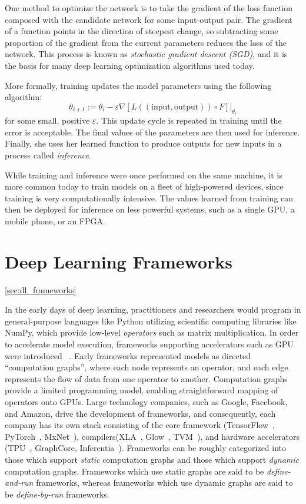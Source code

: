 One method to optimize the network is to take the gradient of the loss function composed with the
candidate network for some input-output pair. The gradient of a function points in the direction of
steepest change, so subtracting some proportion of the gradient from the current parameters reduces
the loss of the network. This process is known as \textit{stochastic gradient descent (SGD)}, and it
is the basis for many deep learning optimization algorithms used today.

More formally, training updates the model parameters using the following algorithm:
\[
  \theta_{i+1} := \theta_i - \varepsilon\nabla[L((\text{input}, \text{output})) \circ F]\Big|_{\theta_i}
\]
for some small, positive $\varepsilon$. This update cycle is repeated in training until
the error is acceptable. The final values of the parameters are then used for inference.
Finally, she uses her learned function to produce outputs for new inputs in
  a process called \textit{inference}.

While training and inference were once performed on the same machine,
  it is more common today to train models on a fleet of high-powered devices,
  since training is very computationally intensive.
The values learned from training can then be deployed for inference on less powerful systems,
  such as a single GPU, a mobile phone, or an FPGA.

\section{Deep Learning Frameworks}
\ref{sec:dl_frameworks}

In the early days of deep learning, practitioners and researchers would program
  in general-purpose languages like Python utilizing
  scientific computing libraries like NumPy,
  which provide low-level \textit{operators} such as matrix multiplication.
In order to accelerate model execution,
    frameworks supporting accelerators such as GPU were introduced~\citep{theano} .
Early frameworks represented models as directed ``computation graphs'',
    where each node represents an operator,
    and each edge represents the flow of data from one operator to another.
Computation graphs provide a limited programming model,
    enabling straightforward mapping of operators onto GPUs.
Large technology companies,
    such as Google, Facebook, and Amazon,
    drive the development of frameworks,
    and consequently,
    each company has its own stack consisting
    of the core framework (TensorFlow~\citep{tensorflow}, PyTorch~\citep{pytorch}, MxNet~\citep{mxnet}),
    compilers(XLA~\citep{xla}, Glow~\citep{glow}, TVM~\citep{tvm_osdi18}),
    and hardware accelerators (TPU~\citep{tpuv1}, GraphCore, Inferentia~\citep{inferentia}).
Frameworks can be roughly categorized into those which support \textit{static} computation graphs
  and those which support \textit{dynamic} computation graphs.
Frameworks which use static graphs are said to be \textit{define-and-run} frameworks,
  whereas frameworks which use dynamic graphs are said to be \textit{define-by-run} frameworks.


